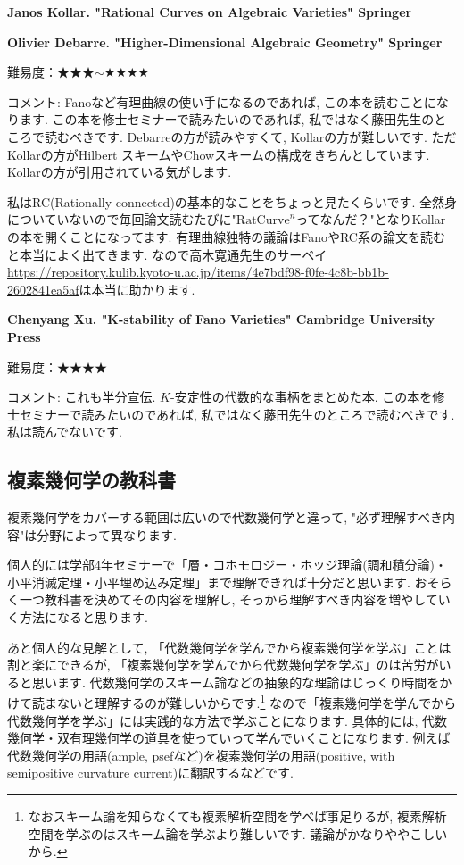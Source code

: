 \textbf{Janos Kollar. "Rational Curves on Algebraic Varieties" Springer} \vspace{-6pt}

\textbf{Olivier Debarre. "Higher-Dimensional Algebraic Geometry" Springer} \vspace{-6pt}

難易度：★★★$\sim$★★★★\vspace{-6pt} 

コメント: Fanoなど有理曲線の使い手になるのであれば, この本を読むことになります. この本を修士セミナーで読みたいのであれば, 私ではなく藤田先生のところで読むべきです. 
Debarreの方が読みやすくて, Kollarの方が難しいです. ただKollarの方がHilbert スキームやChowスキームの構成をきちんとしています. Kollarの方が引用されている気がします.

私はRC(Rationally connected)の基本的なことをちょっと見たくらいです. 全然身についていないので毎回論文読むたびに"$\mathrm{RatCurve}^{n}$ってなんだ？"となりKollarの本を開くことになってます. 有理曲線独特の議論はFanoやRC系の論文を読むと本当によく出てきます. 
なので高木寛通先生のサーベイ\url{https://repository.kulib.kyoto-u.ac.jp/items/4e7bdf98-f0fe-4c8b-bb1b-2602841ea5af}は本当に助かります. 
 \vspace{8pt}
 
 \textbf{Chenyang Xu. "K-stability of Fano Varieties" Cambridge University Press} \vspace{-6pt}

難易度：★★★★\vspace{-6pt} 

コメント: これも半分宣伝. $K$-安定性の代数的な事柄をまとめた本. この本を修士セミナーで読みたいのであれば, 私ではなく藤田先生のところで読むべきです. 私は読んでないです. 
 \vspace{8pt}
 

\subsection{複素幾何学の教科書}
複素幾何学をカバーする範囲は広いので代数幾何学と違って, "必ず理解すべき内容"は分野によって異なります.  

個人的には学部4年セミナーで「層・コホモロジー・ホッジ理論(調和積分論)・小平消滅定理・小平埋め込み定理」まで理解できれば十分だと思います. 
おそらく一つ教科書を決めてその内容を理解し, そっから理解すべき内容を増やしていく方法になると思ります. 

あと個人的な見解として, 「代数幾何学を学んでから複素幾何学を学ぶ」ことは割と楽にできるが, 「複素幾何学を学んでから代数幾何学を学ぶ」のは苦労がいると思います. 代数幾何学のスキーム論などの抽象的な理論はじっくり時間をかけて読まないと理解するのが難しいからです.\footnote{なおスキーム論を知らなくても複素解析空間を学べば事足りるが, 複素解析空間を学ぶのはスキーム論を学ぶより難しいです. 議論がかなりややこしいから. } 
なので「複素幾何学を学んでから代数幾何学を学ぶ」には実践的な方法で学ぶことになります. 
具体的には, 代数幾何学・双有理幾何学の道具を使っていって学んでいくことになります. 
例えば代数幾何学の用語(ample, psefなど)を複素幾何学の用語(positive, with semipositive curvature current)に翻訳するなどです. 

